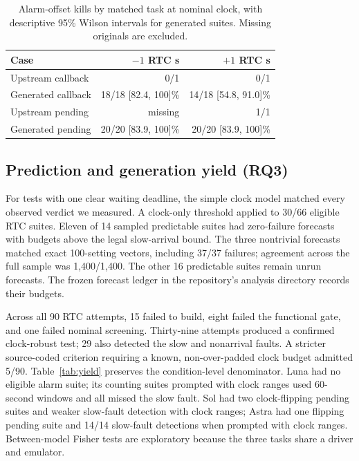 \documentclass[sigconf,nonacm]{acmart}
\begin{document}
\begin{table}[t]
\caption{Alarm-offset kills by matched task at nominal clock, with descriptive 95\% Wilson intervals for generated suites. Missing originals are excluded.}
\label{tab:offset}\scriptsize
\begin{tabular}{@{}lrr@{}}\toprule
Case & $-1$ RTC s & $+1$ RTC s \\ \midrule
Upstream callback & 0/1 & 0/1 \\
Generated callback & 18/18 [82.4, 100]\% & 14/18 [54.8, 91.0]\% \\
Upstream pending & missing & 1/1 \\
Generated pending & 20/20 [83.9, 100]\% & 20/20 [83.9, 100]\% \\
\bottomrule\end{tabular}
\end{table}

\subsection{Prediction and generation yield (RQ3)}
For tests with one clear waiting deadline, the simple clock model matched every observed verdict we measured. A clock-only threshold applied to 30/66 eligible RTC suites. Eleven of 14 sampled predictable suites had zero-failure forecasts with budgets above the legal slow-arrival bound. The three nontrivial forecasts matched exact 100-setting vectors, including 37/37 failures; agreement across the full sample was 1,400/1,400. The other 16 predictable suites remain unrun forecasts. The frozen forecast ledger in the repository's analysis directory records their budgets.

Across all 90 RTC attempts, 15 failed to build, eight failed the functional gate, and one failed nominal screening. Thirty-nine attempts produced a confirmed clock-robust test; 29 also detected the slow and nonarrival faults. A stricter source-coded criterion requiring a known, non-over-padded clock budget admitted 5/90. Table~\ref{tab:yield} preserves the condition-level denominator. Luna had no eligible alarm suite; its counting suites prompted with clock ranges used 60-second windows and all missed the slow fault. Sol had two clock-flipping pending suites and weaker slow-fault detection with clock ranges; Astra had one flipping pending suite and 14/14 slow-fault detections when prompted with clock ranges. Between-model Fisher tests are exploratory because the three tasks share a driver and emulator.
\end{document}
